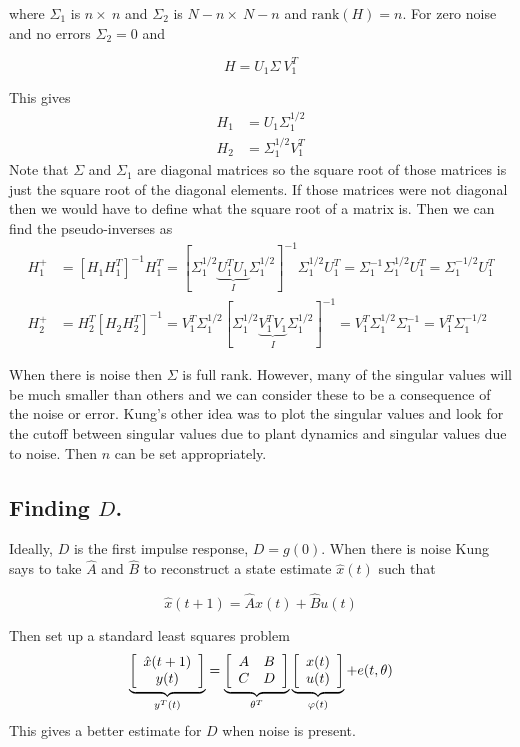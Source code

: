 where $\Sigma_1$ is $n\times~n$ and $\Sigma_2$ is $N-n\times~N-n$ and $\text{rank} (H)=n$.
For zero noise and no errors $\Sigma_2=0$ and

\begin{equation*}
H = U_1 \Sigma~V_1^T
\end{equation*}

This gives
\begin{align*}
H_1 &= U_1\Sigma_1^{1/2} \\
H_2 &= \Sigma_1^{1/2}V_1^T
\end{align*}
Note that $\Sigma$ and $\Sigma_1$ are diagonal matrices so the square root of those matrices is just the square root of the diagonal elements.
If those matrices were not diagonal then we would have to define what the square root of a matrix is.
Then we can find the pseudo-inverses as
\begin{align*}
H_1^+ &= {[H_1H_1^T]}^{-1}H_1^T = {[\Sigma_1^{1/2}\underbrace{U_1^T U_1}_{I}\Sigma_1^{1/2}]}^{-1}\Sigma_1^{1/2}U_1^T = \Sigma_1^{-1}\Sigma_1^{1/2}U_1^T = \Sigma_1^{-1/2}U_1^T \\
H_2^+ &= H_2^T{[H_2H_2^T]}^{-1} = V_1^T\Sigma_1^{1/2}{[\Sigma_1^{1/2}\underbrace{V_1^T V_1}_{I}\Sigma_1^{1/2}]}^{-1} = V_1^T\Sigma_1^{1/2}\Sigma_1^{-1} = V_1^T\Sigma_1^{-1/2}
\end{align*}

When there is noise then $\Sigma$ is full rank.
However, many of the singular values will be much smaller than others and we can consider these to be a consequence of the noise or error.
Kung's other idea was to plot the singular values and look for the cutoff between singular values due to plant dynamics and singular values due to noise.
Then $n$ can be set appropriately.

\subsection{Finding $D$.}
Ideally, $D$ is the first impulse response, $D=g(0)$.
When there is noise Kung says to take $\hat{A}$ and $\hat{B}$ to reconstruct a state estimate $\hat{x}(t)$ such that

\begin{equation*}
\hat{x}(t+1) = \hat{A}x(t)+\hat{B}u(t)
\end{equation*}

Then set up a standard least squares problem
\begin{align*}
\underbrace{\left[\begin{array}{c} \hat{x}(t+1) \\ y(t) \end{array}\right]}_{y^T(t)}
= \underbrace{\left[\begin{array}{c c} A & B \\ C & D \end{array}\right]}_{\theta^T}
\underbrace{\left[\begin{array}{c} x(t) \\ u(t) \end{array}\right]}_{\varphi(t)} + e(t,\theta)
\end{align*}
This gives a better estimate for $D$ when noise is present.

